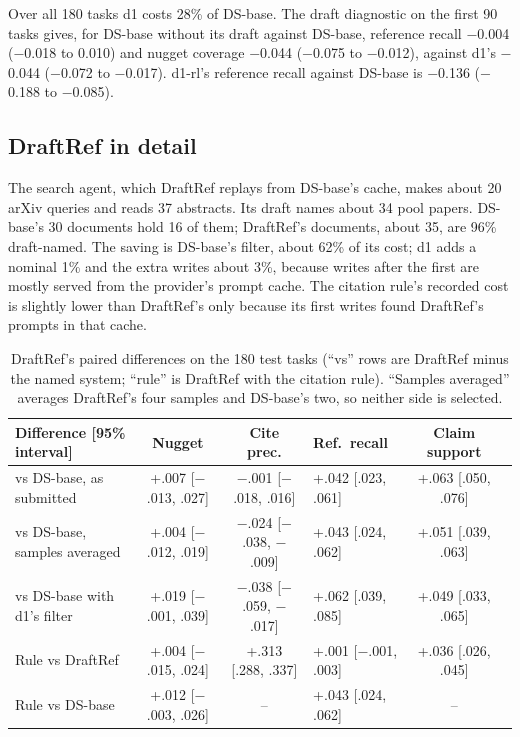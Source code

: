 \documentclass[11pt, letterpaper]{article}
\newcommand{\n}{$-$}
\begin{document}
Over all 180 tasks d1 costs 28\% of DS-base. The draft diagnostic on the first 90 tasks gives, for DS-base
without its draft against DS-base, reference recall $-$0.004 ($-$0.018 to 0.010) and nugget coverage
$-$0.044 ($-$0.075 to $-$0.012), against d1's $-$0.044 ($-$0.072 to $-$0.017). d1-rl's reference
recall against DS-base is $-$0.136 ($-$0.188 to $-$0.085).

\subsection{DraftRef in detail}
\label{app:draftref}

The search agent, which DraftRef replays from DS-base's cache, makes about 20 arXiv queries and reads
37 abstracts. Its draft names about 34 pool papers. DS-base's 30 documents hold 16 of them; DraftRef's
documents, about 35, are 96\% draft-named. The saving is DS-base's filter, about 62\% of its cost; d1
adds a nominal 1\% and the extra writes about 3\%, because writes after the first are mostly served
from the provider's prompt cache. The citation rule's recorded cost is slightly lower than DraftRef's
only because its first writes found DraftRef's prompts in that cache.

\begin{table}[H]
\centering\footnotesize\setlength{\tabcolsep}{3pt}
\begin{tabular}{l cc V cc}
\toprule
Difference [95\% interval] & Nugget & Cite prec. & Ref.\ recall & Claim support\\
\midrule
vs DS-base, as submitted & +.007 [\n.013, .027] & \n.001 [\n.018, .016] & +.042 [.023, .061] &
+.063 [.050, .076] \\
vs DS-base, samples averaged & +.004 [\n.012, .019] & \n.024 [\n.038, \n.009] & +.043 [.024,
.062] & +.051 [.039, .063] \\
vs DS-base with d1's filter & +.019 [\n.001, .039] & \n.038 [\n.059, \n.017] & +.062 [.039,
.085] & +.049 [.033, .065] \\
Rule vs DraftRef & +.004 [\n.015, .024] & +.313 [.288, .337] & +.001 [\n.001, .003] & +.036
[.026, .045] \\
Rule vs DS-base & +.012 [\n.003, .026] & -- & +.043 [.024, .062] & -- \\
\bottomrule
\end{tabular}
\caption{DraftRef's paired differences on the 180 test tasks (``vs'' rows are DraftRef minus the named system; ``rule'' is DraftRef with the citation rule). ``Samples averaged'' averages
DraftRef's four samples and DS-base's two, so neither side is selected.}
\end{table}
\end{document}
